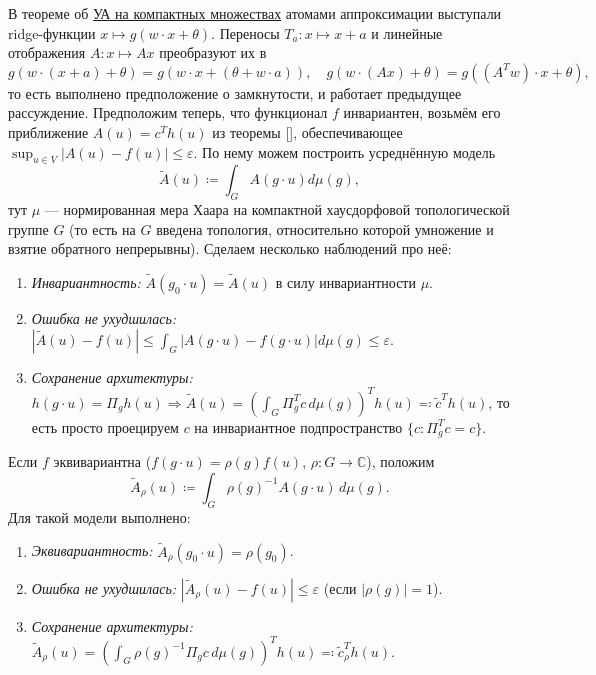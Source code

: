 \documentclass[a4paper, 12pt]{article}
\theoremstyle{definition}
\theoremstyle{plain}
\theoremstyle{remark}
\theoremstyle{remark}
\theoremstyle{remark}
\begin{document}
В теореме об \hyperref[thm:uat_compact]{УА на компактных множествах} атомами аппроксимации выступали ridge-функции $x \mapsto g(w \cdot x + \theta)$.
Переносы $T_a\colon x \mapsto x + a$ и линейные отображения $A\colon x \mapsto Ax$ преобразуют их в
$$g(w \cdot (x + a) + \theta) = g(w \cdot x + (\theta + w \cdot a)), \quad g(w \cdot (Ax) + \theta) = g((A^T w) \cdot x + \theta),$$
то есть выполнено предположение о замкнутости, и работает предыдущее рассуждение.
Предположим теперь, что функционал $f$ инвариантен, возьмём его приближение $A(u) = c^T h(u)$ из теоремы [], обеспечивающее $\sup_{u \in V} |A(u) - f(u)| \le \varepsilon$.
По нему можем построить усреднённую модель
$$\widetilde{A}(u) \coloneq \int_G A(g \cdot u) d\mu(g),$$
тут $\mu$ --- нормированная мера Хаара на компактной хаусдорфовой топологической группе $G$ (то есть на $G$ введена топология, относительно которой умножение и взятие обратного непрерывны).
Сделаем несколько наблюдений про неё:
\begin{enumerate}
  \item \emph{Инвариантность:} $\widetilde{A}(g_0 \cdot u) = \widetilde{A}(u)$ в силу инвариантности $\mu$.
  \item \emph{Ошибка не ухудшилась:} $|\widetilde{A}(u) - f(u)| \le \int_G |A(g \cdot u) - f(g \cdot u)| d\mu(g) \le \varepsilon$.
  \item \emph{Сохранение архитектуры:} $h(g \cdot u) = \Pi_g h(u) \Rightarrow \widetilde{A}(u) = \left(\int_G \Pi_g^T c\,d\mu(g)\right)^T h(u) \eqcolon \tilde{c}^T h(u)$, то есть просто проецируем $c$ на инвариантное подпространство $\{c\colon \Pi_g^T c = c\}$.
\end{enumerate}
Если $f$ эквивариантна ($f(g \cdot u) = \rho(g)f(u)$, $\rho\colon G \to \mathbb{C}$), положим
$$\tilde{A}_\rho(u) \coloneq \int_{G} \rho(g)^{-1} A(g \cdot u) \, d\mu(g).$$
Для такой модели выполнено:
\begin{enumerate}
  \item \emph{Эквивариантность:} $\tilde{A}_\rho(g_0 \cdot u) = \rho(g_0)$.
  \item \emph{Ошибка не ухудшилась:} $|\widetilde{A}_\rho(u) - f(u)| \le \varepsilon$ (если $|\rho(g)| = 1$).
  \item \emph{Сохранение архитектуры:} $\tilde{A}_{\rho}(u) = (\int_{G} \rho(g)^{-1} \Pi_g c \, d\mu(g))^T h(u) \eqcolon \tilde{c}_\rho^T h(u)$.
\end{enumerate}
\end{document}
